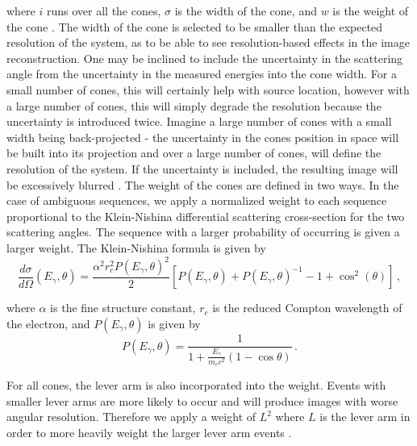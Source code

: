\documentclass[10pt]{article}
\begin{document}
\noindent where $i$ runs over all the cones, $\sigma$ is the width of the cone, and $w$ is the weight of the cone \cite{Haefner2015}. The width of the cone is selected to be smaller than the expected resolution of the system, as to be able to see resolution-based effects in the image reconstruction. One may be inclined to include the uncertainty in the scattering angle from the uncertainty in the measured energies into the cone width. For a small number of cones, this will certainly help with source location, however with a large number of cones, this will simply degrade the resolution because the uncertainty is introduced twice. Imagine a large number of cones with a small width being back-projected - the uncertainty in the cones position in space will be built into its projection and over a large number of cones, will define the resolution of the system. If the uncertainty is included, the resulting image will be excessively blurred \cite{Haefner2015}. The weight of the cones are defined in two ways. In the case of ambiguous sequences, we apply a normalized weight to each sequence proportional to the Klein-Nishina differential scattering cross-section for the two scattering angles. The sequence with a larger probability of occurring is given a larger weight. The Klein-Nishina formula is given by 
%
\begin{equation}
\frac{d\sigma}{d\Omega}(E_\gamma, \theta) = \frac{\alpha^2 r_c^2 P(E_\gamma, \theta)^2}{2} \left[ P(E_\gamma, \theta) + P(E_\gamma, \theta)^{-1} - 1 + \cos^2(\theta) \right]\,,
\end{equation}

\noindent where $\alpha$ is the fine structure constant, $r_c$ is the reduced Compton wavelength of the electron, and $P(E_\gamma, \theta)$ is given by
\begin{equation}
P(E_\gamma, \theta) = \frac{1}{1+\frac{E_\gamma}{m_e c^2}(1-\cos\theta)}\,.
\end{equation}

For all cones, the lever arm is also incorporated into the weight. Events with smaller lever arms are more likely to occur and will produce images with worse angular resolution. Therefore we apply a weight of $L^2$ where $L$ is the lever arm in order to more heavily weight the larger lever arm events \cite{Haefner2015}.
\end{document}

